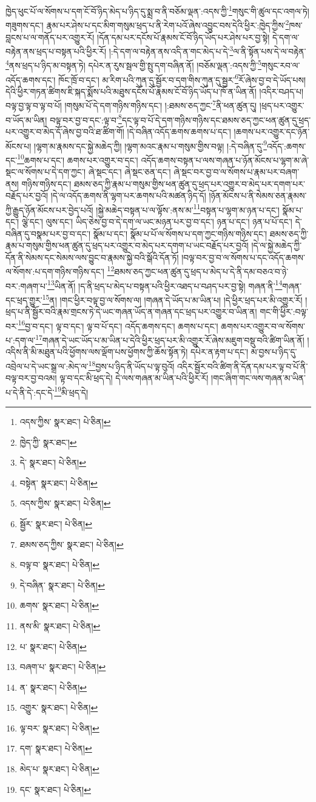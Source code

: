 ཁྱེད་ཕུང་པོ་ལ་སོགས་པ་དག་ངོ་བོ་ཉིད་མེད་པ་ཉིད་དུ་སྨྲ་བ་ནི་བཅོམ་ལྡན་:འདས་ཀྱི་\footnote{འདས་ཀྱིས་  སྣར་ཐང་།  པེ་ཅིན། }གསུང་གི་ཚུལ་དང་འགལ་ཏེ། གཟུགས་དང་། རྣམ་པར་ཤེས་པ་དང་མིག་གསུམ་ཕྲད་པ་ནི་རེག་པའོ་ཞེས་འབྱུང་བས་དེའི་ཕྱིར་:ཁྱེད་ཀྱིས་\footnote{ཁྱེད་ཀྱི་  སྣར་ཐང་། }ཁས་བླངས་པ་ལ་གནོད་པར་འགྱུར་རོ། །དོན་དམ་པར་དངོས་པོ་རྣམས་ངོ་བོ་ཉིད་ཡོད་པར་ཤེས་པར་བྱ་སྟེ། དེ་དག་ལ་བརྟེན་ནས་ཕྲད་པ་བསྟན་པའི་ཕྱིར་རོ། །:དེ་དག་ལ་བརྟེན་ནས་འདི་ན་གང་མེད་པ་དེ་\footnote{དེ་  སྣར་ཐང་།  པེ་ཅིན། }ལ་ནི་སྟོན་པས་དེ་ལ་བརྟེན་\footnote{བསྟེན་  སྣར་ཐང་།  པེ་ཅིན། }ནས་ཕྲད་པ་ཉིད་མ་བསྟན་ཏེ། དཔེར་ན་རུས་སྦལ་གྱི་སྤུ་དག་བཞིན་ནོ། །བཅོམ་ལྡན་:འདས་ཀྱི་\footnote{འདས་ཀྱིས་  སྣར་ཐང་།  པེ་ཅིན། }གསུང་རབ་ལ་འདོད་ཆགས་དང་། ཁོང་ཁྲོ་བ་དང་། མ་རིག་པའི་ཀུན་དུ་སྦྱོར་བ་དག་གིས་ཀུན་དུ་སྦྱར་\footnote{སྦྱོར་  སྣར་ཐང་།  པེ་ཅིན། }རོ་ཞེས་བྱ་བ་དེ་ཡོད་པས། དེའི་ཕྱིར་གཏན་ཚིགས་ཇི་སྐད་སྨོས་པའི་མཐུས་དངོས་པོ་རྣམས་ངོ་བོ་ཉིད་ཡོད་པ་ཁོ་ན་ཡིན་ནོ། །འདིར་བཤད་པ། བལྟ་བྱ་ལྟ་བ་ལྟ་བ་པོ། །གསུམ་པོ་དེ་དག་གཉིས་གཉིས་དང་། །:ཐམས་ཅད་ཀྱང་\footnote{ཐམས་ཅད་ཀྱིས་  སྣར་ཐང་།  པེ་ཅིན། }ནི་ཕན་ཚུན་དུ། །ཕྲད་པར་འགྱུར་བ་ཡོད་མ་ཡིན། བལྟ་བར་བྱ་བ་དང་:ལྟ་བ་\footnote{བལྟ་བ་  སྣར་ཐང་།  པེ་ཅིན། }དང་ལྟ་བ་པོ་དེ་དག་གཉིས་གཉིས་དང་ཐམས་ཅད་ཀྱང་ཕན་ཚུན་དུ་ཕྲད་པར་འགྱུར་བ་མེད་དོ་ཞེས་བྱ་བའི་ཐ་ཚིག་གོ། །དེ་བཞིན་འདོད་ཆགས་ཆགས་པ་དང་། །ཆགས་པར་འགྱུར་དང་ཉོན་མོངས་པ། །ལྷག་མ་རྣམས་དང་སྐྱེ་མཆེད་ཀྱི། །ལྷག་མའང་རྣམ་པ་གསུམ་གྱིས་བལྟ། །:དེ་བཞིན་དུ་\footnote{དེ་བཞིན་  སྣར་ཐང་།  པེ་ཅིན། }འདོད་:ཆགས་དང་\footnote{ཆགས་  སྣར་ཐང་།  པེ་ཅིན། }ཆགས་པ་དང་། ཆགས་པར་འགྱུར་བ་དང་། འདོད་ཆགས་བསྟན་པ་ལས་གཞན་པ་ཉོན་མོངས་པ་ལྷག་མ་ཞེ་སྡང་ལ་སོགས་པ་དེ་དག་ཀྱང་། ཞེ་སྡང་དང་། ཞེ་སྡང་ཅན་དང་། ཞེ་སྡང་བར་བྱ་བ་ལ་སོགས་པ་རྣམ་པར་བཞག་ནས། གཉིས་གཉིས་དང་། ཐམས་ཅད་ཀྱི་རྣམ་པ་གསུམ་གྱིས་ཕན་ཚུན་དུ་ཕྲད་པར་འགྱུར་བ་མེད་པར་དགག་པར་བརྗོད་པར་བྱའོ། །དེ་ལ་འདོད་ཆགས་ནི་ལྷག་པར་ཆགས་པའི་མཚན་ཉིད་དོ། །ཉོན་མོངས་པ་ནི་སེམས་ཅན་རྣམས་ཀྱི་རྒྱུད་ཉོན་མོངས་པར་བྱེད་པའོ། །སྐྱེ་མཆེད་བསྟན་པ་ལ་ལྟོས་:ནས་མ་\footnote{ནས་མི་  སྣར་ཐང་།  པེ་ཅིན། }བསྟན་པ་ལྷག་མ་ཉན་པ་དང་། སྣོམ་པ་དང་། ལྕེ་དང་། ལུས་དང་། ཡིད་ཅེས་བྱ་བ་དེ་དག་ལ་ཡང་མཉན་པར་བྱ་བ་དང་། ཉན་པ་དང་། ཉན་པ་པོ་དང་། དེ་བཞིན་དུ་བསྣམ་པར་བྱ་བ་དང་། སྣོམ་པ་དང་། སྣོམ་པ་པོ་ལ་སོགས་པ་དག་ཀྱང་གཉིས་གཉིས་དང་། ཐམས་ཅད་ཀྱི་རྣམ་པ་གསུམ་གྱིས་ཕན་ཚུན་དུ་ཕྲད་པར་འགྱུར་བ་མེད་པར་དགག་པ་ཡང་བརྗོད་པར་བྱའོ། །དེ་ལ་སྐྱེ་མཆེད་ཀྱི་དོན་ནི་སེམས་དང་སེམས་ལས་བྱུང་བ་རྣམས་སྐྱེ་བའི་སྒོའི་དོན་ཏོ། །བལྟ་བར་བྱ་བ་ལ་སོགས་པ་དང་འདོད་ཆགས་ལ་སོགས་:པ་དག་གཉིས་གཉིས་དང་། \footnote{པ་  སྣར་ཐང་།  པེ་ཅིན། }ཐམས་ཅད་ཀྱང་ཕན་ཚུན་དུ་ཕྲད་པ་མེད་པ་དེ་ནི་དམ་བཅའ་བ་ཉེ་བར་:གཞག་པ་\footnote{བཞག་པ་  སྣར་ཐང་།  པེ་ཅིན། }ཡིན་ནོ། །ད་ནི་ཕྲད་པ་མེད་པ་བསྟན་པའི་ཕྱིར་འཐད་པ་བཤད་པར་བྱ་སྟེ། གཞན་ནི་\footnote{ན་  སྣར་ཐང་།  པེ་ཅིན། }གཞན་དང་ཕྲད་གྱུར་\footnote{འགྱུར་  སྣར་ཐང་།  པེ་ཅིན། }ན། །གང་ཕྱིར་བལྟ་བྱ་ལ་སོགས་ལ། །གཞན་དེ་ཡོད་པ་མ་ཡིན་པ། །དེ་ཕྱིར་ཕྲད་པར་མི་འགྱུར་རོ། །ཕྲད་པ་ནི་སྦྱོར་བའི་རྣམ་གྲངས་ཏེ་དེ་ཡང་གཞན་ཡོད་ན་གཞན་དང་ཕྲད་པར་འགྱུར་བ་ཡིན་ན། གང་གི་ཕྱིར་:བལྟ་བར་\footnote{ལྟ་བར་  སྣར་ཐང་།  པེ་ཅིན། }བྱ་བ་དང་། ལྟ་བ་དང་། ལྟ་བ་པོ་དང་། འདོད་ཆགས་དང་། ཆགས་པ་དང་། ཆགས་པར་འགྱུར་བ་ལ་སོགས་པ་:དག་ལ་\footnote{དག་  སྣར་ཐང་།  པེ་ཅིན། }གཞན་དེ་ཡང་ཡོད་པ་མ་ཡིན་པ་དེའི་ཕྱིར་ཕྲད་པར་མི་འགྱུར་རོ་ཞེས་མཇུག་བསྡུ་བའི་ཚིག་ཡིན་ནོ། །འདིས་ནི་མི་མཐུན་པའི་ཕྱོགས་ལས་ལྡོག་པས་ཕྱོགས་ཀྱི་ཆོས་སྟོན་ཏེ། དཔེར་ན་རྟག་པ་དང་། མ་བྱས་པ་ཉིད་དུ་འབྲེལ་པ་དེ་ཡང་སྒྲ་ལ་:མེད་ལ་\footnote{མེད་པ་  སྣར་ཐང་།  པེ་ཅིན། }བྱས་པ་ཉིད་ནི་ཡོད་པ་ལྟ་བུའོ། འདིར་སྦྱོར་བའི་ཚིག་ནི་དོན་དམ་པར་ལྟ་བ་པོ་ནི་བལྟ་བར་བྱ་བའམ། ལྟ་བ་དང་མི་ཕྲད་དེ། དེ་ལས་གཞན་མ་ཡིན་པའི་ཕྱིར་རོ། །གང་ཞིག་གང་ལས་གཞན་མ་ཡིན་པ་དེ་ནི་དེ་:དང་དེ་\footnote{དང་  སྣར་ཐང་།  པེ་ཅིན། }མི་ཕྲད་དེ། 